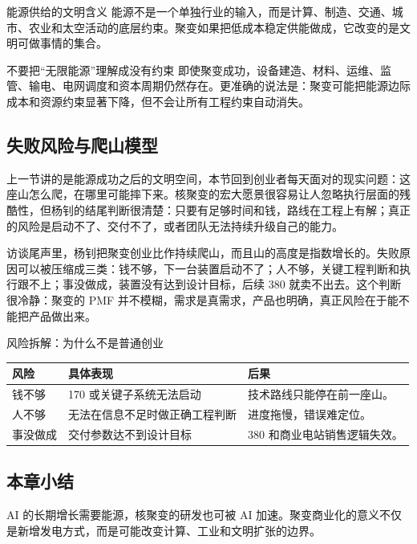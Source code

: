 \begin{importantbox}{能源供给的文明含义}
能源不是一个单独行业的输入，而是计算、制造、交通、城市、农业和太空活动的底层约束。聚变如果把低成本稳定供能做成，它改变的是文明可做事情的集合。
\end{importantbox}

\begin{warningbox}{不要把“无限能源”理解成没有约束}
即使聚变成功，设备建造、材料、运维、监管、输电、电网调度和资本周期仍然存在。更准确的说法是：聚变可能把能源边际成本和资源约束显著下降，但不会让所有工程约束自动消失。
\end{warningbox}

\subsection{失败风险与爬山模型}

上一节讲的是能源成功之后的文明空间，本节回到创业者每天面对的现实问题：这座山怎么爬，在哪里可能摔下来。核聚变的宏大愿景很容易让人忽略执行层面的残酷性，但杨钊的结尾判断很清楚：只要有足够时间和钱，路线在工程上有解；真正的风险是启动不了、交付不了，或者团队无法持续升级自己的能力。

访谈尾声里，杨钊把聚变创业比作持续爬山，而且山的高度是指数增长的。失败原因可以被压缩成三类：钱不够，下一台装置启动不了；人不够，关键工程判断和执行跟不上；事没做成，装置没有达到设计目标，后续 380 就卖不出去。这个判断很冷静：聚变的 PMF 并不模糊，需求是真需求，产品也明确，真正风险在于能不能把产品做出来。

\begin{knowledgebox}{风险拆解：为什么不是普通创业}
\begin{tabularx}{\textwidth}{p{}p{}X}
\toprule
风险 & 具体表现 & 后果 \\
\midrule
钱不够 & 170 或关键子系统无法启动 & 技术路线只能停在前一座山。 \\
人不够 & 无法在信息不足时做正确工程判断 & 进度拖慢，错误难定位。 \\
事没做成 & 交付参数达不到设计目标 & 380 和商业电站销售逻辑失效。 \\
\bottomrule
\end{tabularx}
\end{knowledgebox}

\subsection{本章小结}

AI 的长期增长需要能源，核聚变的研发也可被 AI 加速。聚变商业化的意义不仅是新增发电方式，而是可能改变计算、工业和文明扩张的边界。

